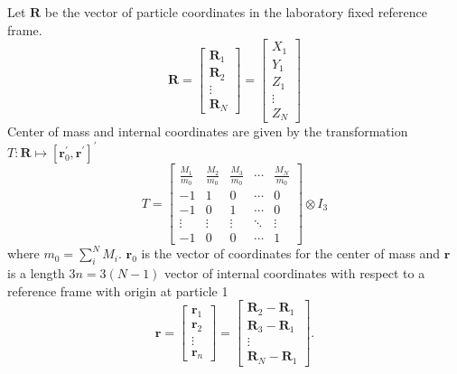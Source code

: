 \documentclass[12pt,thmsa]{article}
\begin{document}
Let $\mathbf{R}$ be the vector of particle coordinates in the laboratory
fixed reference frame. 
\begin{equation}
\mathbf{R=}\left[ 
\begin{array}{c}
\mathbf{R}_1 \\ 
\mathbf{R}_2 \\ 
\vdots \\ 
\mathbf{R}_N
\end{array}
\right] =\left[ 
\begin{array}{c}
X_1 \\ 
Y_1 \\ 
Z_1 \\ 
\vdots \\ 
Z_N
\end{array}
\right]
\end{equation}
Center of mass and internal coordinates are given by the transformation $T:%
\mathbf{R}\mapsto [\mathbf{r}_0^{\prime },\mathbf{r}^{\prime }]^{\prime }$ 
\begin{equation}
T=\left[ 
\begin{array}{ccccc}
\frac{M_1}{m_0} & \frac{M_2}{m_0} & \frac{M_3}{m_0} & \cdots & \frac{M_N}{m_0%
} \\ 
-1 & 1 & 0 & \cdots & 0 \\ 
-1 & 0 & 1 & \cdots & 0 \\ 
\vdots & \vdots & \vdots & \ddots & \vdots \\ 
-1 & 0 & 0 & \cdots & 1
\end{array}
\right] \otimes I_3  \label{Ttran}
\end{equation}
where $m_0=\sum_i^NM_i$. $\mathbf{r}_0$ is the vector of coordinates for the
center of mass and $\mathbf{r}$ is a length $3n=3\left( N-1\right) $ vector
of internal coordinates with respect to a reference frame with origin at
particle 1 
\begin{equation}
\mathbf{r=}\left[ 
\begin{array}{c}
\mathbf{r}_1 \\ 
\mathbf{r}_2 \\ 
\vdots \\ 
\mathbf{r}_n
\end{array}
\right] =\left[ 
\begin{array}{c}
\mathbf{R}_2-\mathbf{R}_1 \\ 
\mathbf{R}_3-\mathbf{R}_1 \\ 
\vdots \\ 
\mathbf{R}_N-\mathbf{R}_1
\end{array}
\right] .  \label{rdef}
\end{equation}
\end{document}

